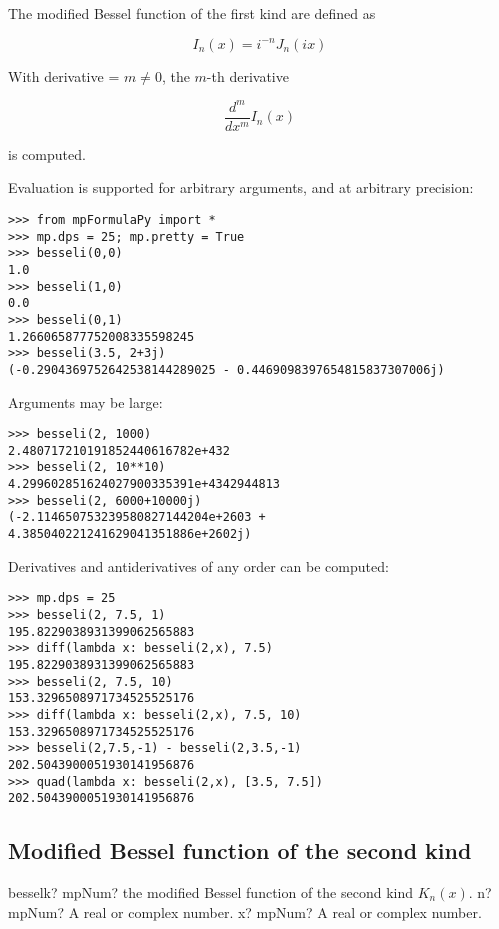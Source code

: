 The modified Bessel function of the first kind are defined as

\begin{equation}
I_n(x)=i^{-n}J_n(ix)
\end{equation}

With derivative = $m \neq 0$, the $m$-th derivative

\begin{equation}
\frac{d^m}{dx^m}I_n(x)
\end{equation}

is computed.

Evaluation is supported for arbitrary arguments, and at arbitrary precision:

\begin{lstlisting}
>>> from mpFormulaPy import *
>>> mp.dps = 25; mp.pretty = True
>>> besseli(0,0)
1.0
>>> besseli(1,0)
0.0
>>> besseli(0,1)
1.266065877752008335598245
>>> besseli(3.5, 2+3j)
(-0.2904369752642538144289025 - 0.4469098397654815837307006j)
\end{lstlisting}

Arguments may be large:

\begin{lstlisting}
>>> besseli(2, 1000)
2.480717210191852440616782e+432
>>> besseli(2, 10**10)
4.299602851624027900335391e+4342944813
>>> besseli(2, 6000+10000j)
(-2.114650753239580827144204e+2603 + 4.385040221241629041351886e+2602j)
\end{lstlisting}


Derivatives and antiderivatives of any order can be computed:

\begin{lstlisting}
>>> mp.dps = 25
>>> besseli(2, 7.5, 1)
195.8229038931399062565883
>>> diff(lambda x: besseli(2,x), 7.5)
195.8229038931399062565883
>>> besseli(2, 7.5, 10)
153.3296508971734525525176
>>> diff(lambda x: besseli(2,x), 7.5, 10)
153.3296508971734525525176
>>> besseli(2,7.5,-1) - besseli(2,3.5,-1)
202.5043900051930141956876
>>> quad(lambda x: besseli(2,x), [3.5, 7.5])
202.5043900051930141956876
\end{lstlisting}




\subsection{Modified Bessel function of the  second kind}

\begin{mpFunctionsExtract}
	\mpFunctionTwo
	{besselk? mpNum? the modified Bessel function of the second kind $K_n(x)$.}
	{n? mpNum? A real or complex number.}
	{x? mpNum? A real or complex number.}	
\end{mpFunctionsExtract}



